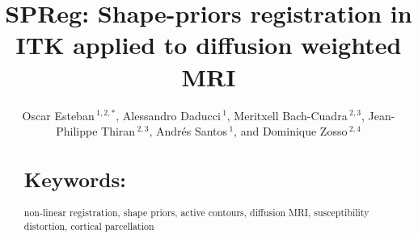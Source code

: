 \documentclass{frontiers}
\def\firstAuthorLast{Esteban {et~al}} %
\def\Authors{Oscar Esteban\,$^{1,2,*}$, Alessandro Daducci\,$^{1}$, Meritxell Bach-Cuadra\,$^{2,3}$, Jean-Philippe Thiran\,$^{2,3}$,
Andr\'es Santos\,$^{1}$, and Dominique Zosso\,$^{2,4}$}
\begin{document}
\onecolumn
{}

\title[SPReg: shape-priors registration in ITK]{SPReg: Shape-priors registration in ITK applied to diffusion weighted MRI}
\author[\firstAuthorLast ]{\Authors}
\address{}
\correspondance{}
\editor{}

\maketitle

%


\begin{abstract}



\section{}


\tiny
  \section{Keywords:} non-linear registration, shape priors, active contours, diffusion MRI, susceptibility distortion, cortical parcellation
\end{abstract}
\end{document}
